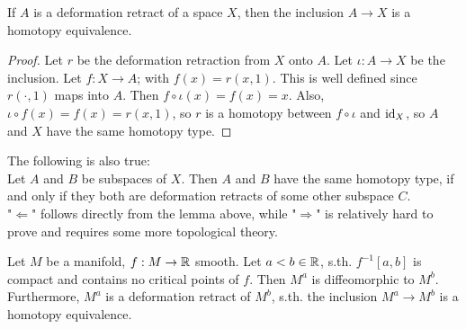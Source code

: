 \begin{lemma}
   If $A$ is a deformation retract of a space $X$, then the inclusion 
   $A \rightarrow X$ is a homotopy equivalence.
\end{lemma}

\begin{proof}
   Let $r$ be the deformation retraction from $X$ onto $A$. Let 
   $\iota: A \rightarrow X$ be the inclusion. Let 
   $f: X \rightarrow A$; with $f(x) = r(x, 1)$. This is well defined since 
   $r(\cdot, 1)$ maps into $A$. Then $f \circ \iota (x) = f(x) = x$. Also, 
   $\iota \circ f(x) = f(x) = r(x, 1)$, so $r$ is a homotopy between 
   $f \circ \iota$ and ${\operatorname{id}}_X$, so $A$ and $X$ have the same homotopy type.
\end{proof}

\begin{remark}
   The following is also true: \\
   Let $A$ and $B$ be subspaces of $X$. Then
   $A$ and $B$ have the same homotopy type, if and only if they both are 
   deformation retracts of some other subspace $C$. \\
   "$\Leftarrow$" follows directly from the lemma above, while "$\Rightarrow$"
   is relatively hard to prove and requires some more topological theory.
\end{remark}

\begin{theorem}
   \label{theorem:1st deformation lemma}
   Let $M$ be a manifold, $f: M \rightarrow {\mathbb R}$ smooth. Let $a < b \in {\mathbb R}$, 
   s.th. $f^{-1}[a, b]$ is compact and contains no critical points of $f$. Then 
   $M^a$ is diffeomorphic to $M^b$. \\ 
   Furthermore, $M^a$ is a deformation retract of $M^b$, s.th. the 
   inclusion $M^a \rightarrow M^b$ is a homotopy equivalence.
\end{theorem}

